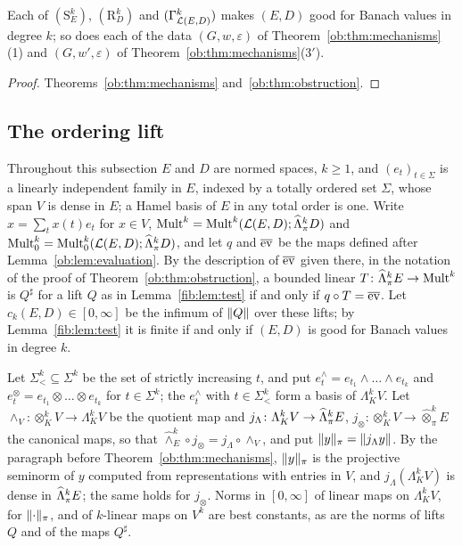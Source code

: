 \begin{corollary}\label{ob:cor:mechanisms}
Each of $(\mathrm S^k_E)$, $(\mathrm R^k_D)$ and $(\Gamma^k_{\mathcal L(E,D)})$ makes $(E,D)$ good for Banach values in degree $k$;
so does each of the data $(G,w,\varepsilon)$ of Theorem~\ref{ob:thm:mechanisms}(1) and $(G,w',\varepsilon)$ of
Theorem~\ref{ob:thm:mechanisms}(3$'$).
\end{corollary}

\begin{proof}
Theorems~\ref{ob:thm:mechanisms} and~\ref{ob:thm:obstruction}.
\end{proof}

\subsection{The ordering lift}\label{ob:ssec:ordering}

Throughout this subsection $E$ and $D$ are normed spaces, $k\ge1$, and $(e_t)_{t\in\Sigma}$ is a linearly independent
family in $E$, indexed by a totally ordered set $\Sigma$, whose span $V$ is dense in $E$; a Hamel basis of $E$ in any total
order is one. Write $x=\sum_tx(t)e_t$ for $x\in V$, $\operatorname{Mult}^k=\operatorname{Mult}^k(\mathcal L(E,D);\widehat\Lambda^k_\pi D)$ and
$\operatorname{Mult}^k_0=\operatorname{Mult}^k_0(\mathcal L(E,D);\widehat\Lambda^k_\pi D)$, and let $q$ and $\overline{\operatorname{ev}}$ be the maps defined after
Lemma~\ref{ob:lem:evaluation}. By the description of $\overline{\operatorname{ev}}$ given there, in the notation of the proof of
Theorem~\ref{ob:thm:obstruction}, a bounded linear $T\colon\widehat\Lambda^k_\pi E\to\operatorname{Mult}^k$ is $Q^\sharp$ for a lift $Q$ as in
Lemma~\ref{fib:lem:test} if and only if $q\circ T=\overline{\operatorname{ev}}$. Let $c_k(E,D)\in[0,\infty]$ be the infimum of $\lVert Q\rVert$
over these lifts; by Lemma~\ref{fib:lem:test} it is finite if and only if $(E,D)$ is good for Banach values in degree $k$.

Let $\Sigma^k_<\subseteq\Sigma^k$ be the set of strictly increasing $t$, and put $e^\wedge_t=e_{t_1}\wedge\dots\wedge e_{t_k}$
and $e^\otimes_t=e_{t_1}\otimes\dots\otimes e_{t_k}$ for $t\in\Sigma^k$; the $e^\wedge_t$ with $t\in\Sigma^k_<$ form a basis
of $\Lambda^k_KV$. Let $\wedge_V\colon\otimes^k_KV\to\Lambda^k_KV$ be the quotient map and
$j_\Lambda\colon\Lambda^k_KV\to\widehat\Lambda^k_\pi E$, $j_\otimes\colon\otimes^k_KV\to\widehat\otimes^k_\pi E$ the canonical maps,
so that $\widehat\wedge^k_E\circ j_\otimes=j_\Lambda\circ\wedge_V$, and put $\lVert y\rVert_\pi=\lVert j_\Lambda y\rVert$. By the paragraph
before Theorem~\ref{ob:thm:mechanisms}, $\lVert y\rVert_\pi$ is the projective seminorm of $y$ computed from representations with
entries in $V$, and $j_\Lambda(\Lambda^k_KV)$ is dense in $\widehat\Lambda^k_\pi E$; the same holds for $j_\otimes$. Norms in
$[0,\infty]$ of linear maps on $\Lambda^k_KV$, for $\lVert \cdot\rVert_\pi$, and of $k$-linear maps on $V^k$ are best constants,
as are the norms of lifts $Q$ and of the maps $Q^\sharp$.

